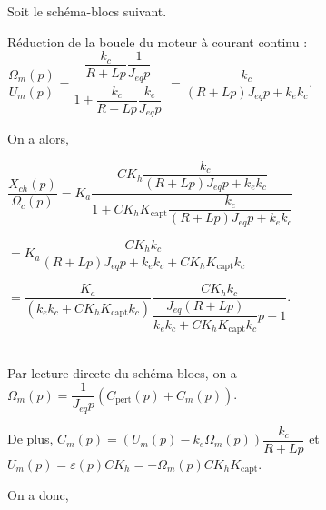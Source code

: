 \normaltrue \difficilefalse \tdifficilefalse
\correctiontrue


\setcounter{question}{0}
\ifcorrection
\else
{}
\fi

\ifprof
\else
Soit le schéma-blocs suivant. 
\begin{figure}[H]
\centering
{}
\end{figure}
\fi

\ifprof
Réduction de la boucle du moteur à courant continu : 
$\dfrac{\Omega_m(p)}{U_m(p)}=\dfrac{\dfrac{k_c}{R+Lp}\dfrac{1}{J_{eq}p}}{1+\dfrac{k_c}{R+Lp}\dfrac{k_e}{J_{eq}p}}$
$=\dfrac{k_c}{\left(R+Lp\right)J_{eq}p+k_ek_c}$.

On a alors, 

$
\dfrac{X_{ch}(p)}{\Omega_c(p)} =
K_a  \dfrac{CK_h \dfrac{k_c}{\left(R+Lp\right)J_{eq}p+k_ek_c}}{1+CK_hK_{\text{capt}} \dfrac{k_c}{\left(R+Lp\right)J_{eq}p+k_ek_c}}
$ 

$
=
K_a \dfrac{CK_h k_c}{\left(R+Lp\right)J_{eq}p+k_ek_c+CK_hK_{\text{capt}} k_c}
$

$
=
\dfrac{K_a }{\left( k_ek_c+CK_hK_{\text{capt}} k_c\right)} \dfrac{CK_h k_c}{\dfrac{J_{eq}\left(R+Lp\right)}{k_ek_c+CK_hK_{\text{capt}} k_c}p+1}
$.

\else
\fi

\ifprof ~\\
Par lecture directe du schéma-blocs, on a 
$\Omega_m(p) = \dfrac{1}{J_{eq}p}\left(C_{\text{pert}}(p) + C_m(p)\right)$.

De plus, 
$C_m(p) = \left(U_m(p)-k_e\Omega_m(p)\right) \dfrac{k_c}{R+Lp}$
 et $U_m(p)=\varepsilon(p) C K_h = -\Omega_m(p) C K_h K_{\text{capt}}$.
 
 On a donc, 
 

